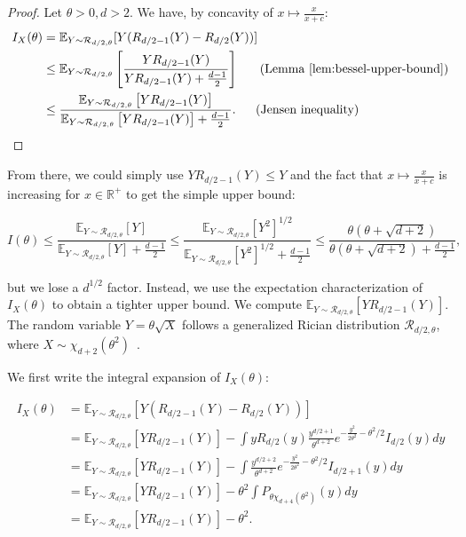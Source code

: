 \documentclass{article}
\theoremstyle{plain}
\theoremstyle{definition}
\theoremstyle{remark}
\begin{document}
\propFisherUpperBoundOneDim*


\begin{proof}
Let $\theta > 0, d > 2$. We have, by concavity of $x \mapsto \frac{x}{x+c}$:
    \begin{align*}
        I_X(\theta) &= \mathbb{E}_{Y \sim \mathcal{R}_{d/2,\theta}}[Y (R_{d/2-1}(Y) - R_{d/2}(Y))]\\
        &\leq \mathbb{E}_{Y \sim \mathcal{R}_{d/2,\theta}}\left[\frac{Y R_{d/2-1}(Y)}{Y R_{d/2-1}(Y) + \frac{d-1}{2}}\right] \;\;\;\;\;\text{ (Lemma~\ref{lem:bessel-upper-bound})}\\
        &\leq \frac{\mathbb{E}_{Y \sim \mathcal{R}_{d/2,\theta}}\left[Y R_{d/2-1}(Y)\right]}{\mathbb{E}_{Y \sim \mathcal{R}_{d/2,\theta}}\left[Y R_{d/2-1}(Y)\right] + \frac{d-1}{2}}. \;\;\;\;\,\text{ (Jensen inequality)}
    \end{align*}
\end{proof}

From there, we could simply use $Y R_{d/2-1}(Y)\leq Y$ and the fact that $x \mapsto \frac{x}{x+c}$ is increasing for $x \in \mathbb{R}^+$ to get the simple upper bound:

\[I(\theta)\leq \frac{\mathbb{E}_{Y \sim \mathcal{R}_{d/2,\theta}}\left[Y\right]}{\mathbb{E}_{Y \sim \mathcal{R}_{d/2,\theta}}\left[Y\right] + \frac{d-1}{2}}\leq \frac{\mathbb{E}_{Y \sim \mathcal{R}_{d/2,\theta}}\left[Y^2\right]^{1/2}}{\mathbb{E}_{Y \sim \mathcal{R}_{d/2,\theta}}\left[Y^2\right]^{1/2} + \frac{d-1}{2}} \leq \frac{\theta(\theta + \sqrt{d+2})}{\theta(\theta + \sqrt{d+2}) + \frac{d-1}{2}},\]

but we lose a $d^{1/2}$ factor. Instead, we use the expectation characterization of $I_X(\theta)$ to obtain a tighter upper bound.
We compute $\mathbb{E}_{Y \sim \mathcal{R}_{d/2,\theta}}\left[Y R_{d/2-1}(Y)\right]$. The random variable $Y = \theta \sqrt{X}$ follows a generalized Rician distribution $\mathcal{R}_{d/2,\theta}$, where $X\sim \chi_{d+2}(\theta^2)$~\citep{Idier2014}.

We first write the integral expansion of $I_X(\theta)$:

\begin{align*}
    I_X(\theta) &= \mathbb{E}_{Y \sim \mathcal{R}_{d/2,\theta}}[Y (R_{d/2-1}(Y) - R_{d/2}(Y))]\\
    &= \mathbb{E}_{Y \sim \mathcal{R}_{d/2,\theta}}[Y R_{d/2-1}(Y)] - \int y R_{d/2}(y) \frac{y^{d/2+1}}{\theta^{d+2}} e^{-\frac{y^2}{2\theta^2} - \theta^2/2} I_{d/2}(y)dy\\
    &= \mathbb{E}_{Y \sim \mathcal{R}_{d/2,\theta}}[Y R_{d/2-1}(Y)] - \int   \frac{y^{d/2+2}}{\theta^{d+2}}  e^{-\frac{y^2 }{2\theta^2} - \theta^2/2} I_{d/2+1}(y)dy\\
    &= \mathbb{E}_{Y \sim \mathcal{R}_{d/2,\theta}}[Y R_{d/2-1}(Y)] - \theta^2 \int P_{\theta \chi_{d+4}(\theta^2)}(y) dy\\
    &= \mathbb{E}_{Y \sim \mathcal{R}_{d/2,\theta}}[Y R_{d/2-1}(Y)] - \theta^2.
\end{align*}
\end{document}
